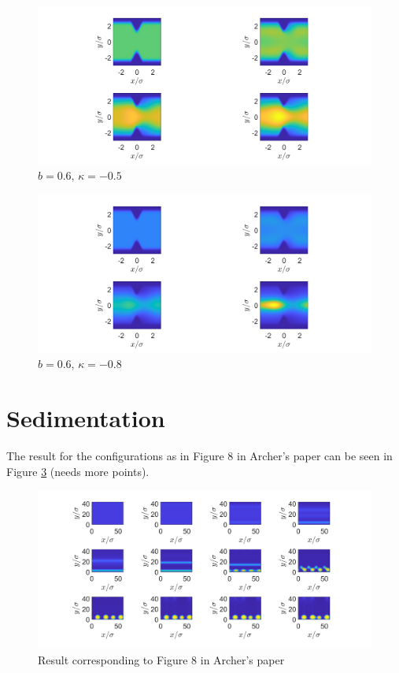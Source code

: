 \documentclass[11pt, a4paper]{article}
\theoremstyle{definition}
\begin{document}
\begin{figure}[h]
	\centering
	\includegraphics[scale=0.4]{ConFa3.png}
	\caption{$b = 0.6$, $\kappa = -0.5$} 
	\label{F3c}
\end{figure}
\begin{figure}[h]
	\centering
	\includegraphics[scale=0.4]{ConFa4.png}
	\caption{$b = 0.6$, $\kappa = -0.8$} 
	\label{F3d}
\end{figure}



\section{Sedimentation}

The result for the configurations as in Figure 8 in Archer's paper can be seen in Figure \ref{F4a} (needs more points).

\begin{figure}[h]
	\centering
	\includegraphics[scale=0.4]{PrettyPicture.png}
	\caption{Result corresponding to Figure 8 in Archer's paper} 
	\label{F4a}
\end{figure}
\end{document}
